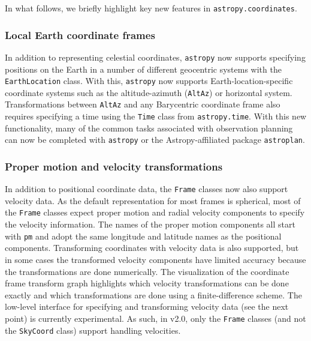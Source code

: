 \documentclass[modern]{aastex61}
\newcommand{\package}[1]{\texttt{#1}\xspace}
\newcommand{\astropy}{Astropy\xspace}
\newcommand{\astropypkg}{\package{astropy}}
\begin{document}
In what follows, we briefly highlight key new features in
\texttt{astropy.coordinates}.

\subsubsection{Local Earth coordinate frames}
In addition to representing celestial
    coordinates, \astropypkg now supports specifying positions on the Earth in
    a number of different geocentric systems with the \texttt{EarthLocation}
    class.
    With this, \astropypkg now supports Earth-location-specific coordinate
    systems such as the altitude-azimuth (\texttt{AltAz}) or horizontal system.
    Transformations between \texttt{AltAz} and any Barycentric coordinate frame
    also requires specifying a time using the \texttt{Time} class from
    \texttt{astropy.time}.
    With this new functionality, many of the common tasks associated with
    observation planning can now be completed with \astropypkg or the
    \astropy-affiliated package \package{astroplan}\citep{astroplan_AAS}.

\subsubsection{Proper motion and velocity transformations}
    In addition to positional coordinate data, the \texttt{Frame} classes now
    also support velocity data.
    As the default representation for most frames is spherical, most of the
    \texttt{Frame} classes expect proper motion and radial velocity components
    to specify the velocity information.
    The names of the proper motion components all start with \texttt{pm} and
    adopt the same longitude and latitude names as the positional components.
    Transforming coordinates with velocity data is also supported, but in some
    cases the transformed velocity components have limited accuracy because the
    transformations are done numerically.
    The visualization of the coordinate frame transform graph highlights which
    velocity transformations can be done exactly and which transformations are
    done using a finite-difference scheme.
    The low-level interface for specifying and transforming velocity data (see
    the next point) is currently experimental.
    As such, in v2.0, only the \texttt{Frame} classes (and not the
    \texttt{SkyCoord} class) support handling velocities.

\end{document}
